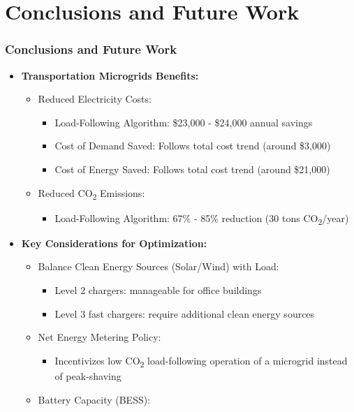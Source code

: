 \documentclass[aspectratio=169, 8 pt]{beamer}
\begin{document}
\section{Conclusions and Future Work}		
	\Large
	\begin{frame}[allowframebreaks]
		\frametitle{Conclusions and Future Work}
		\begin{itemize} \large
			\item \textbf{Transportation Microgrids Benefits:}
			\begin{itemize} \large
				\item Reduced Electricity Costs:
				\begin{itemize} \large
					\item Load-Following Algorithm: \$23,000 - \$24,000 annual savings
					\item Cost of Demand Saved: Follows total cost trend (around \$3,000)
					\item Cost of Energy Saved: Follows total cost trend (around \$21,000)
				\end{itemize}
				\item Reduced CO\textsubscript{2} Emissions: 
				\begin{itemize} \large
					\item Load-Following Algorithm: 67\% - 85\% reduction (30 tons CO\textsubscript{2}/year)
				\end{itemize}
			\end{itemize}
			\item \textbf{Key Considerations for Optimization:}
			\begin{itemize} \large
				\item Balance Clean Energy Sources (Solar/Wind) with Load:
				\begin{itemize} \large
					\item Level 2 chargers: manageable for office buildings
					\item Level 3 fast chargers: require additional clean energy sources
				\end{itemize} \large
				\item Net Energy Metering Policy:
				\begin{itemize} \large
					\item  Incentivizes  low CO\textsubscript{2} load-following operation of a microgrid instead of peak-shaving
				\end{itemize}
				\item Battery Capacity (BESS):
				\begin{itemize} \large

\end{itemize}
\end{itemize}
\end{itemize}
\end{frame}
\end{document}
